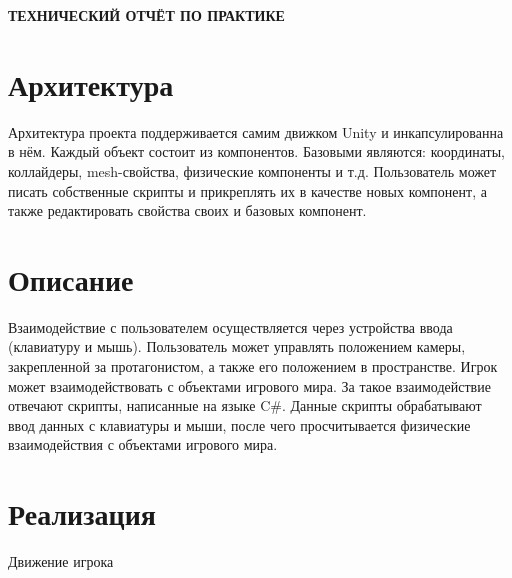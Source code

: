 \begin{center}
\bfseries{\large ТЕХНИЧЕСКИЙ ОТЧЁТ ПО ПРАКТИКЕ}
\end{center}

\section*{Архитектура}

Архитектура проекта поддерживается самим движком Unity и инкапсулированна в нём. Каждый объект состоит из компонентов. Базовыми являются: координаты, коллайдеры, mesh-свойства, физические компоненты и т.д. Пользователь может писать собственные скрипты и прикреплять их в качестве новых компонент, а также редактировать свойства своих и базовых компонент.

\section*{Описание}

Взаимодействие с пользователем осуществляется через устройства ввода (клавиатуру и мышь). Пользователь может управлять положением камеры, закрепленной за протагонистом, а также его положением в пространстве. 
Игрок может взаимодействовать с объектами игрового мира. За такое взаимодействие отвечают скрипты, написанные на языке C\#. Данные скрипты обрабатывают ввод данных с клавиатуры и мыши, после чего просчитывается физические взаимодействия с объектами игрового мира.

\section*{Реализация}

 Движение игрока


